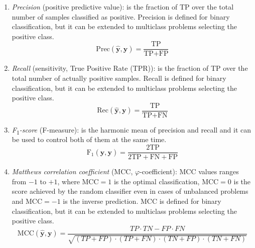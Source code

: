 \begin{enumerate}
\begin{enumerate}[label=(\roman*)]
    			\item \textit{Precision} (\aka positive predictive value): is the fraction of TP over the total number of samples classified as positive. Precision is defined for binary classification, but it can be extended to multiclass problems selecting the positive class.
    			\begin{equation} \label{eq:metrics_precision}
    			\text{Prec} (\bm{\hat y}, \bm{y}) = \frac{\text{TP}}{\text{TP} + \text{FP}}
    			\end{equation}
    			
    			\item \textit{Recall} (\aka sensitivity, True Positive Rate (\ac{TPR})): is the fraction of TP over the total number of actually positive samples. Recall is defined for binary classification, but it can be extended to multiclass problems selecting the positive class.
    			\begin{equation} \label{eq:metrics_recall}
    			\text{Rec}(\bm{\hat y}, \bm{y}) = \frac{\text{TP}}{\text{TP} + \text{FN}}
    			\end{equation}
    			
    			\item \textit{F\textsubscript{$1$}-score} (\aka F-measure): is the harmonic mean of precision and recall and it can be used to control both of them at the same time.
    			\begin{equation} \label{eq:metrics_f1_score}
    			\text{F}_1(\bm{\hat y}, \bm{y}) = \frac{2 \text{TP}}{2 \text{TP} + \text{FN} + \text{FP}}
    			\end{equation}

    			\item \textit{Matthews correlation coefficient} (\ac{MCC}, \aka $\varphi$-coefficient): MCC values ranges from $-1$ to $+1$, where $\text{MCC} = 1$ is the optimal classification,  $\text{MCC} = 0$ is the score achieved by the random classifier even in cases of unbalanced problems and $\text{MCC} = -1$ is the inverse prediction.
    			MCC is defined for binary classification, but it can be extended to multiclass problems selecting the positive class.
    			\begin{equation} \label{eq:metrics_mcc}
    			\text{MCC}(\bm{\hat y}, \bm{y}) = \frac{TP \cdot TN - FP \cdot FN}{\sqrt{(TP+FP) \cdot (TP + FN) \cdot (TN + FP) \cdot (TN + FN)}}
    			\end{equation}
    			

\end{enumerate}
\end{enumerate}
